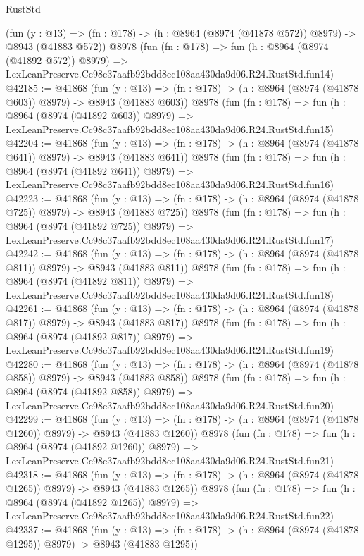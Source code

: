 \begin{lexlean}{RustStd}
\begin{coremodule}
    (fun (y : @13) => (fn : @178) -> (h : @8964 (@8974 (@41878 @572)) @8979) -> @8943 (@41883 @572))
    @8978
    (fun (fn : @178) =>
    fun (h : @8964 (@8974 (@41892 @572)) @8979) =>
    LexLeanPreserve.Cc98c37aafb92bdd8ec108aa430da9d06.R24.RustStd.fun14)
@42185 := @41868
    (fun (y : @13) => (fn : @178) -> (h : @8964 (@8974 (@41878 @603)) @8979) -> @8943 (@41883 @603))
    @8978
    (fun (fn : @178) =>
    fun (h : @8964 (@8974 (@41892 @603)) @8979) =>
    LexLeanPreserve.Cc98c37aafb92bdd8ec108aa430da9d06.R24.RustStd.fun15)
@42204 := @41868
    (fun (y : @13) => (fn : @178) -> (h : @8964 (@8974 (@41878 @641)) @8979) -> @8943 (@41883 @641))
    @8978
    (fun (fn : @178) =>
    fun (h : @8964 (@8974 (@41892 @641)) @8979) =>
    LexLeanPreserve.Cc98c37aafb92bdd8ec108aa430da9d06.R24.RustStd.fun16)
@42223 := @41868
    (fun (y : @13) => (fn : @178) -> (h : @8964 (@8974 (@41878 @725)) @8979) -> @8943 (@41883 @725))
    @8978
    (fun (fn : @178) =>
    fun (h : @8964 (@8974 (@41892 @725)) @8979) =>
    LexLeanPreserve.Cc98c37aafb92bdd8ec108aa430da9d06.R24.RustStd.fun17)
@42242 := @41868
    (fun (y : @13) => (fn : @178) -> (h : @8964 (@8974 (@41878 @811)) @8979) -> @8943 (@41883 @811))
    @8978
    (fun (fn : @178) =>
    fun (h : @8964 (@8974 (@41892 @811)) @8979) =>
    LexLeanPreserve.Cc98c37aafb92bdd8ec108aa430da9d06.R24.RustStd.fun18)
@42261 := @41868
    (fun (y : @13) => (fn : @178) -> (h : @8964 (@8974 (@41878 @817)) @8979) -> @8943 (@41883 @817))
    @8978
    (fun (fn : @178) =>
    fun (h : @8964 (@8974 (@41892 @817)) @8979) =>
    LexLeanPreserve.Cc98c37aafb92bdd8ec108aa430da9d06.R24.RustStd.fun19)
@42280 := @41868
    (fun (y : @13) => (fn : @178) -> (h : @8964 (@8974 (@41878 @858)) @8979) -> @8943 (@41883 @858))
    @8978
    (fun (fn : @178) =>
    fun (h : @8964 (@8974 (@41892 @858)) @8979) =>
    LexLeanPreserve.Cc98c37aafb92bdd8ec108aa430da9d06.R24.RustStd.fun20)
@42299 := @41868
    (fun (y : @13) =>
    (fn : @178) -> (h : @8964 (@8974 (@41878 @1260)) @8979) -> @8943 (@41883 @1260))
    @8978
    (fun (fn : @178) =>
    fun (h : @8964 (@8974 (@41892 @1260)) @8979) =>
    LexLeanPreserve.Cc98c37aafb92bdd8ec108aa430da9d06.R24.RustStd.fun21)
@42318 := @41868
    (fun (y : @13) =>
    (fn : @178) -> (h : @8964 (@8974 (@41878 @1265)) @8979) -> @8943 (@41883 @1265))
    @8978
    (fun (fn : @178) =>
    fun (h : @8964 (@8974 (@41892 @1265)) @8979) =>
    LexLeanPreserve.Cc98c37aafb92bdd8ec108aa430da9d06.R24.RustStd.fun22)
@42337 := @41868
    (fun (y : @13) =>
    (fn : @178) -> (h : @8964 (@8974 (@41878 @1295)) @8979) -> @8943 (@41883 @1295))

\end{coremodule}
\end{lexlean}
